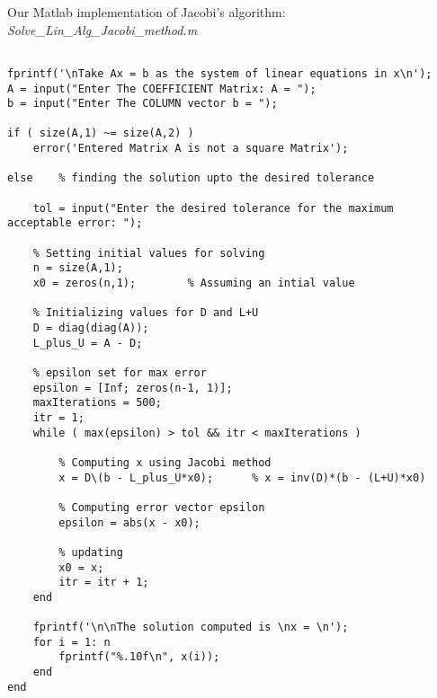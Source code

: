 \documentclass[simulation]{subfiles}
\begin{document}
Our Matlab implementation of Jacobi's algorithm: \textit{Solve\_Lin\_Alg\_Jacobi\_method.m}\\

{\footnotesize
\begin{verbatim}    
    
fprintf('\nTake Ax = b as the system of linear equations in x\n');
A = input("Enter The COEFFICIENT Matrix: A = ");
b = input("Enter The COLUMN vector b = ");

if ( size(A,1) ~= size(A,2) ) 
    error('Entered Matrix A is not a square Matrix');

else    % finding the solution upto the desired tolerance 
    
    tol = input("Enter the desired tolerance for the maximum acceptable error: ");
    
    % Setting initial values for solving
    n = size(A,1);
    x0 = zeros(n,1);        % Assuming an intial value

    % Initializing values for D and L+U
    D = diag(diag(A));
    L_plus_U = A - D;  

    % epsilon set for max error
    epsilon = [Inf; zeros(n-1, 1)];
    maxIterations = 500;
    itr = 1;
    while ( max(epsilon) > tol && itr < maxIterations )

        % Computing x using Jacobi method
        x = D\(b - L_plus_U*x0);      % x = inv(D)*(b - (L+U)*x0)
        
        % Computing error vector epsilon
        epsilon = abs(x - x0);

        % updating
        x0 = x;
        itr = itr + 1;
    end

    fprintf('\n\nThe solution computed is \nx = \n');
    for i = 1: n
        fprintf("%.10f\n", x(i));
    end    
end
    \end{verbatim}
}

\clearpage
\end{document}

